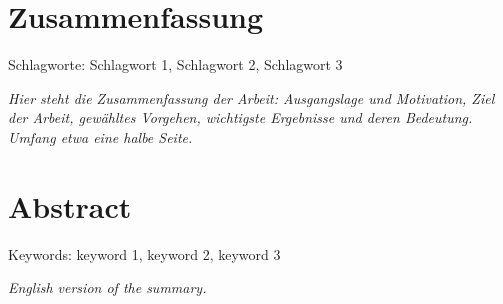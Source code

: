 \section*{Zusammenfassung}
Schlagworte: Schlagwort 1, Schlagwort 2, Schlagwort 3

\bigskip

\textit{Hier steht die Zusammenfassung der Arbeit: Ausgangslage und Motivation, Ziel der Arbeit, gewähltes Vorgehen, wichtigste Ergebnisse und deren Bedeutung. Umfang etwa eine halbe Seite.}

\newpage

\section*{Abstract}
Keywords: keyword 1, keyword 2, keyword 3

\bigskip

\textit{English version of the summary.}

